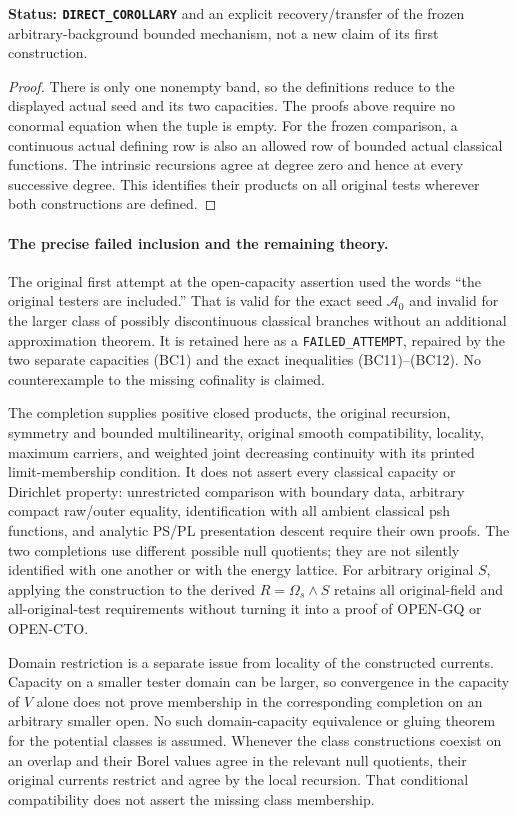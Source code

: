 \noindent\textbf{Status: \texttt{DIRECT\_COROLLARY}} and an
explicit recovery/transfer of the frozen arbitrary-background
bounded mechanism, not a new claim of its first construction.

\begin{proof}
There is only one nonempty band, so the definitions reduce to
the displayed actual seed and its two capacities. The proofs
above require no conormal equation when the tuple is empty.
For the frozen comparison, a continuous actual defining row
is also an allowed row of bounded actual classical functions.
The intrinsic recursions agree at degree zero and hence at
every successive degree. This identifies their products on
all original tests wherever both constructions are defined.
\end{proof}

\paragraph{The precise failed inclusion and the remaining theory.}
The original first attempt at the open-capacity assertion used
the words ``the original testers are included.'' That is valid
for the exact seed $\mathcal A_0$ and invalid for the larger
class of possibly discontinuous classical branches without an
additional approximation theorem. It is retained here as a
\texttt{FAILED\_ATTEMPT}, repaired by the two separate capacities
(BC1) and the exact inequalities (BC11)--(BC12). No counterexample
to the missing cofinality is claimed.

The completion supplies positive closed products, the original
recursion, symmetry and bounded multilinearity, original smooth
compatibility, locality, maximum carriers, and weighted joint
decreasing continuity with its printed limit-membership condition.
It does not assert every classical capacity or Dirichlet property:
unrestricted comparison with boundary data, arbitrary compact
raw/outer equality, identification with all ambient classical psh
functions, and analytic PS/PL presentation descent require their
own proofs. The two completions use different possible null
quotients; they are not silently identified with one another or
with the energy lattice. For arbitrary original $S$, applying
the construction to the derived $R=\Omega_s\wedge S$ retains
all original-field and all-original-test requirements without
turning it into a proof of OPEN-GQ or OPEN-CTO.

Domain restriction is a separate issue from locality of the
constructed currents. Capacity on a smaller tester domain can
be larger, so convergence in the capacity of $V$ alone does not
prove membership in the corresponding completion on an arbitrary
smaller open. No such domain-capacity equivalence or gluing theorem
for the potential classes is assumed. Whenever the class
constructions coexist on an overlap and their Borel values agree
in the relevant null quotients, their original currents restrict
and agree by the local recursion. That conditional compatibility
does not assert the missing class membership.
